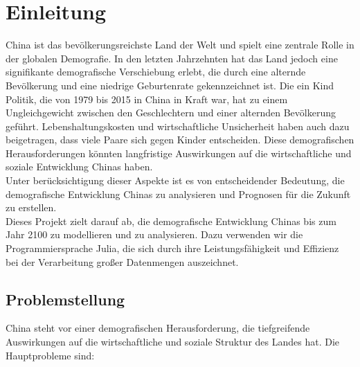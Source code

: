 
\section{Einleitung}
China ist das bevölkerungsreichste Land der Welt und spielt eine zentrale Rolle in der globalen Demografie. In den letzten Jahrzehnten hat das Land jedoch eine signifikante demografische Verschiebung erlebt, die durch eine alternde Bevölkerung und eine niedrige Geburtenrate gekennzeichnet ist. Die ein Kind Politik, die von 1979 bis 2015 in China in Kraft war, hat zu einem Ungleichgewicht zwischen den Geschlechtern und einer alternden Bevölkerung geführt. Lebenshaltungskosten und wirtschaftliche Unsicherheit haben auch dazu beigetragen, dass viele Paare sich gegen Kinder entscheiden. Diese demografischen Herausforderungen könnten langfristige Auswirkungen auf die wirtschaftliche und soziale Entwicklung Chinas haben.\\  

Unter berücksichtigung dieser Aspekte ist es von entscheidender Bedeutung, die demografische Entwicklung Chinas zu analysieren und Prognosen für die Zukunft zu erstellen.\\

Dieses Projekt zielt darauf ab, die demografische Entwicklung Chinas bis zum Jahr 2100 zu modellieren und zu analysieren. Dazu verwenden wir die Programmiersprache Julia, die sich durch ihre Leistungsfähigkeit und Effizienz bei der Verarbeitung großer Datenmengen auszeichnet. 
\\


\subsection{Problemstellung}
China steht vor einer demografischen Herausforderung, die tiefgreifende Auswirkungen auf die wirtschaftliche und soziale Struktur des Landes hat. Die Hauptprobleme sind:


